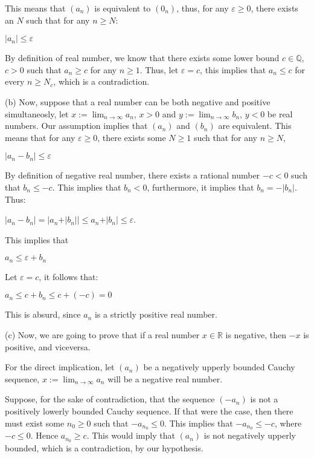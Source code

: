 \documentclass{article}
\theoremstyle{remark}
\begin{document}
\begin{enumerate}
        This means that $(a_n)$ is equivalent to $(0_n)$, thus, for any $\varepsilon \geq 0$, there
        exists an $N$ such that for any $n\geq N$:
        \begin{center}
            $\vert a_n \vert \leq \varepsilon$
        \end{center}
        By definition of real number, we know that there exists some lower bound $c \in \mathbb{Q}$, $c > 0$ such that 
        $a_n \geq c$ for any $n \geq 1$.
        Thus, let $\varepsilon = c$, this implies that $a_n \leq c$ for every $n \geq N_c$, which is a contradiction.

        (b) Now, suppose that a real number can be both negative and positive simultaneosly,
        let $x := \lim_{n \to \infty}a_n$, $x > 0$ and $y := \lim_{n \to \infty}b_n$, $y < 0$ be real numbers.
        Our assumption implies that $(a_n)$ and $(b_n)$ are equivalent. This means that for any $\varepsilon \geq 0$, there exists
        some $N \geq 1$ such that for any $n \geq N$,
        \begin{center}
            $\vert a_n - b_n \vert \leq \varepsilon$
        \end{center}
        By definition of negative real number, there exists a rational number $-c < 0$ such that
        $b_n \leq -c$. This implies that $b_n < 0$, furthermore, it implies that $b_n = -\vert b_n \vert$. Thus:
        \begin{center}
            $\vert a_n - b_n \vert = \vert a_n + \vert b_n \vert \vert \leq a_n + \vert b_n \vert \leq \varepsilon$.
        \end{center}
        This implies that 
        \begin{center}
            $a_n \leq \varepsilon + b_n$
        \end{center}
        Let $\varepsilon = c$, it follows that:
        \begin{center}
            $a_n \leq c + b_n \leq c + (-c) = 0$
        \end{center}
        This is absurd, since $a_n$ is a strictly positive real number.

        (c) Now, we are going to prove that if a real number $x \in \mathbb{R}$ is negative, then $-x$ is positive,
        and viceversa.

        For the direct implication, let $(a_n)$ be a negatively upperly bounded Cauchy sequence, $x := \lim_{n\to \infty}a_n$ will be a negative real number.
        
        Suppose, for the sake of contradiction, that the sequence $(-a_n)$ is not a positively lowerly bounded Cauchy sequence.
        If that were the case, then there must exist some $n_0 \geq 0$ such that $-a_{n_0} \leq 0$.
        This implies that $-a_{n_0} \leq -c$, where $-c \leq 0$.
        Hence $a_{n_0} \geq c$. This would imply that $(a_n)$ is not negatively upperly bounded, which is a contradiction, by our hypothesis.


\end{enumerate}
\end{document}

